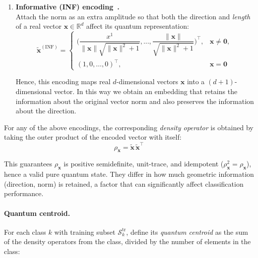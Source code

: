 \documentclass[twocolumn]{article} %
\begin{document}
\begin{enumerate}[leftmargin=*,label=\textbf{(\alph*)}]
\item \textbf{Informative (INF) encoding~\cite{Sergioli2025}.}\\[2pt]
      Attach the norm as an extra amplitude so that both the direction
      and \emph{length} of a real vector $\mathbf{x}\in\mathbb{R}^{d}$ affect
      its quantum representation:
      \[
        \tilde{\mathbf{x}}^{(\mathrm{INF})}
          =
          \begin{cases}
            \bigl(
              \dfrac{x^{1}}{\lVert\mathbf{x}\rVert\sqrt{\lVert\mathbf{x}\rVert^{2}+1}},
              ...,
              \dfrac{\lVert\mathbf{x}\rVert}{\sqrt{\lVert\mathbf{x}\rVert^{2}+1}}
            \bigr)^{\!\top},
              & \mathbf{x}\neq\mathbf{0},\\[6pt]
            (1,0,\dots,0)^{\!\top},
              & \mathbf{x}=\mathbf{0}
          \end{cases}
      \]

      Hence, this encoding maps real $d$-dimensional vectors $\mathbf{x}$
      into a $(d+1)$-dimensional vector.
      In this way we obtain an embedding that retains the information
      about the original vector norm and also preserves the information about the direction.
\end{enumerate}


\medskip
For any of the above encodings, the corresponding \emph{density
operator} is obtained by taking the outer product of the encoded
vector with itself:
\begin{equation}
  \rho_{\mathbf x}= \tilde{\mathbf x}\,\tilde{\mathbf x}^{\!\top}
  \label{eq:density-definition}
\end{equation}

This guarantees \(\rho_{\mathbf x}\) is positive semidefinite,
unit-trace, and idempotent (\(\rho_{\mathbf x}^{2}=\rho_{\mathbf x}\)),
hence a valid pure quantum state.
They differ in how much geometric information (direction, norm) is retained, a factor that can
significantly affect classification performance.

\paragraph{Quantum centroid.}
For each class \(k\) with training subset
\(\mathcal S_{k}^{\mathrm{tr}}\), define its \emph{quantum centroid} as the sum of the density operators from the class, divided by the number of elements in the class:
\end{document}
